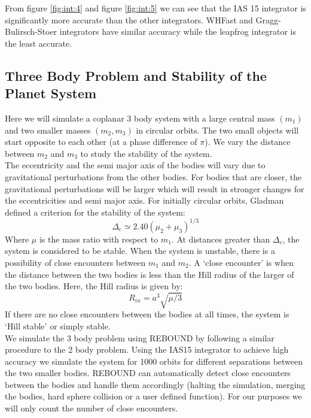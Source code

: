 \documentclass[12pt,a4paper]{article}
\begin{document}
From figure \ref{fig:int:4} and figure \ref{fig:int:5} we can see that the IAS 15 integrator is significantly more accurate than the other integrators. WHFast and Gragg-Bulirsch-Stoer integrators have similar accuracy while
 the leapfrog integrator is the least accurate.
\subsection{Three Body Problem and Stability of the Planet System}
\label{sec:3body}
Here we will simulate a coplanar 3 body system with a large central mass $(m_1)$ and two smaller masses $(m_2, m_3)$ in circular orbits. The two small objects will start opposite to each other (at a 
phase difference of $\pi$). We vary the distance  between $m_2$ and $m_3$ to study the stability of the system.\\
The eccentricity and the semi major axis of the bodies will vary due to gravitational perturbations from the other bodies. For bodies that are closer, the gravitational perturbations will be larger which will result in
stronger changes for the eccentricities and semi major axis. For initially circular orbits, Gladman\cite{Gladman} defined a criterion for the stability of the system:
\begin{equation}
  \Delta_c \simeq 2.40(\mu_2+\mu_3)^{1/3}
\end{equation}
Where $\mu$ is the mass ratio with respect to $m_1$. %
At distances greater than $\Delta_c$, the system is considered to be stable. When the system is unstable, there is a possibility of close encounters between $m_1$ and $m_2$. A `close encounter' is when the distance between 
the two bodies is less than the Hill radius of the larger of the two bodies. Here, the Hill radius is given by:
\begin{equation}
  R_{in} = a^3\sqrt{\mu/3}
\end{equation}
If there are no close encounters between the bodies at all times, the system is `Hill stable' or simply stable.\\
We simulate the 3 body problem using REBOUND by following a similar procedure to the 2 body problem. Using the IAS15 integrator to achieve high accuracy we simulate the system for 1000 orbits for different separations 
between the two smaller bodies. REBOUND can automatically detect close encounters between the bodies and handle them accordingly (halting the simulation, merging the bodies, hard sphere collision or a user defined function). 
For our purposes we will only count the number of close encounters.\\
\end{document}
